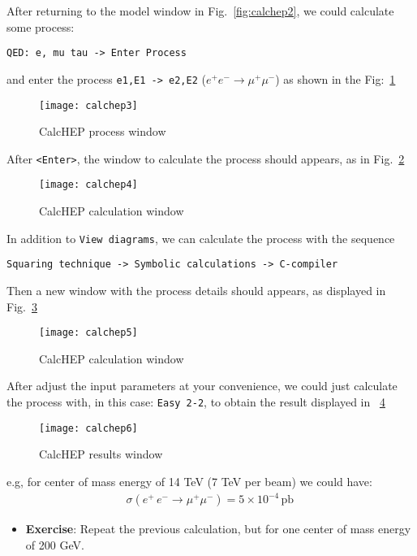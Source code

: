 \begin{frame}{}
After returning to the model window in Fig.~\ref{fig:calchep2}, we could calculate some process:
\begin{lstlisting}
QED: e, mu tau -> Enter Process 
\end{lstlisting}
and enter the process \lstinline{e1,E1 -> e2,E2} ($e^+ e^-\to \mu^+\mu^-$) as shown in the Fig:~\ref{fig:calchep3}
\begin{figure}
  \centering
  \texttt{[image: calchep3]}
  \caption{CalcHEP process window}
  \label{fig:calchep3}
\end{figure}
After \lstinline{<Enter>}, the window to calculate the process should appears, as in Fig.~\ref{fig:calchep4}
\begin{figure}
  \centering
  \texttt{[image: calchep4]}
  \caption{CalcHEP calculation window}
  \label{fig:calchep4}
\end{figure}
In addition to \lstinline{View diagrams}, we can calculate the process with the sequence
\begin{lstlisting}
Squaring technique -> Symbolic calculations -> C-compiler
\end{lstlisting}
Then a new window with the process details should appears, as displayed in Fig.~\ref{fig:calchep5}
\begin{figure}
  \centering
  \texttt{[image: calchep5]}
  \caption{CalcHEP calculation window}
  \label{fig:calchep5}
\end{figure}
After adjust the input parameters at your convenience, we could just calculate the process with, in this case: \lstinline{Easy 2-2}, to obtain the result displayed in ~\ref{fig:calchep6}
\begin{figure}
  \centering
  \texttt{[image: calchep6]}
  \caption{CalcHEP results window}
  \label{fig:calchep6}
\end{figure}
e.g, for center of mass energy of 14 TeV (7 TeV per beam) we could have:
\begin{align}
  \sigma(e^+\,e^-\to \mu^+\mu^-)=5\times 10^{-4}\,\text{pb}\,
\end{align}
\begin{itemize}
\item \textbf{Exercise}:
Repeat the previous calculation, but for one center of mass energy of 200 GeV.
\end{itemize}


\end{frame}


